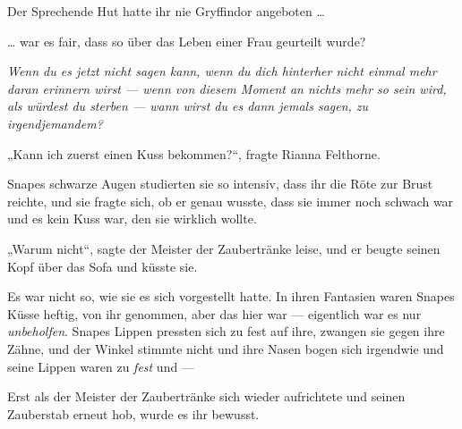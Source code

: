 Der Sprechende Hut hatte ihr nie Gryffindor angeboten …

… war es fair, dass so über das Leben einer Frau geurteilt wurde?

\emph{Wenn du es jetzt nicht sagen kann, wenn du dich hinterher nicht einmal mehr daran erinnern wirst — wenn von diesem Moment an nichts mehr so sein wird, als würdest du sterben — wann wirst du es dann jemals sagen, zu irgendjemandem?}

„Kann ich zuerst einen Kuss bekommen?“, fragte Rianna Felthorne.

Snapes schwarze Augen studierten sie so intensiv, dass ihr die Röte zur Brust reichte, und sie fragte sich, ob er genau wusste, dass sie immer noch schwach war und es kein Kuss war, den sie wirklich wollte.

„Warum nicht“, sagte der Meister der Zaubertränke leise, und er beugte seinen Kopf über das Sofa und küsste sie.

Es war nicht so, wie sie es sich vorgestellt hatte. In ihren Fantasien waren Snapes Küsse heftig, von ihr genommen, aber das hier war — eigentlich war es nur \emph{unbeholfen}. Snapes Lippen pressten sich zu fest auf ihre, zwangen sie gegen ihre Zähne, und der Winkel stimmte nicht und ihre Nasen bogen sich irgendwie und seine Lippen waren zu \emph{fest} und —

Erst als der Meister der Zaubertränke sich wieder aufrichtete und seinen Zauberstab erneut hob, wurde es ihr bewusst.

